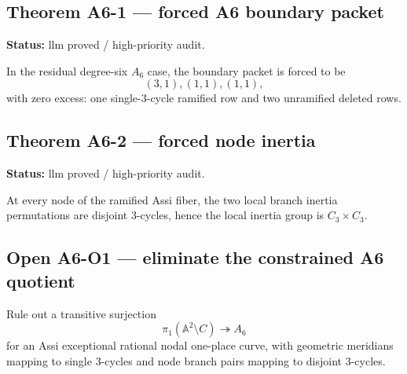 \subsection{Theorem A6-1 --- forced A6 boundary
packet}\label{theorem-a6-1-forced-a6-boundary-packet}

\textbf{Status:} llm proved / high-priority audit.

In the residual degree-six \(A_6\) case, the boundary packet is forced
to be \[
(3,1),(1,1),(1,1),
\] with zero excess: one single-3-cycle ramified row and two unramified
deleted rows.

\subsection{Theorem A6-2 --- forced node
inertia}\label{theorem-a6-2-forced-node-inertia}

\textbf{Status:} llm proved / high-priority audit.

At every node of the ramified Assi fiber, the two local branch inertia
permutations are disjoint 3-cycles, hence the local inertia group is
\(C_3\times C_3\).

\subsection{Open A6-O1 --- eliminate the constrained A6
quotient}\label{open-a6-o1-eliminate-the-constrained-a6-quotient}

Rule out a transitive surjection \[
\pi_1(\mathbb A^2\setminus C)\twoheadrightarrow A_6
\] for an Assi exceptional rational nodal one-place curve, with
geometric meridians mapping to single 3-cycles and node branch pairs
mapping to disjoint 3-cycles.


